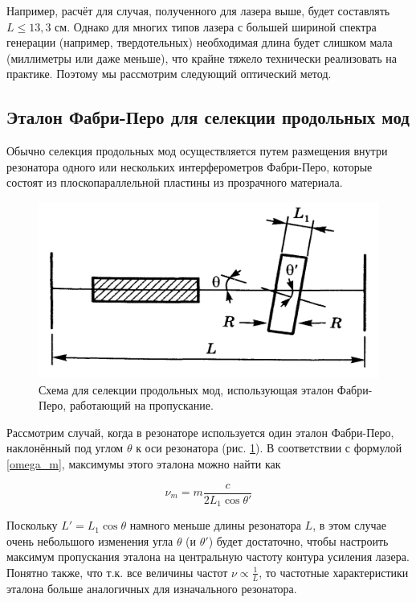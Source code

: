 \documentclass[12pt]{kiarticle}
\begin{document}
Например, расчёт для случая, полученного для лазера выше, будет составлять $ L \leq 13,3 $ см. Однако для многих типов лазера с большей шириной спектра генерации (например, твердотельных) необходимая длина будет слишком мала (миллиметры или даже меньше), что крайне тяжело технически реализовать на практике. Поэтому мы рассмотрим следующий оптический метод.

\subsection{Эталон Фабри-Перо для селекции продольных мод}

Обычно селекция продольных мод осуществляется путем размещения внутри резонатора одного или нескольких интерферометров Фабри-Перо, которые состоят из плоскопараллельной пластины из прозрачного материала. 

\begin{figure} 
	\includegraphics[width=\linewidth]{FP_selection}
	\caption{Схема для селекции продольных мод, использующая эталон 	Фабри-Перо, работающий на пропускание.}
	\label{FP_selection}
\end{figure}

Рассмотрим случай, когда в резонаторе используется один эталон Фабри-Перо, наклонённый под углом $ \theta $ к оси резонатора (рис. \ref{FP_selection}). В соответствии с формулой \eqref{omega_m}, максимумы этого эталона можно найти как 

\begin{equation}\label{}
\nu_m = m \dfrac{c}{2L_1 \cos \theta'}
\end{equation}

Поскольку $ L' = L_1 \cos \theta $ намного меньше длины резонатора $ L $, в этом случае очень небольшого изменения угла $ \theta $ (и $ \theta' $) будет достаточно, чтобы настроить максимум пропускания эталона на центральную частоту контура усиления лазера. Понятно также, что т.к. все величины частот $ \nu \propto \frac{1}{L} $, то частотные характеристики эталона больше аналогичных для изначального резонатора. 
\end{document}
